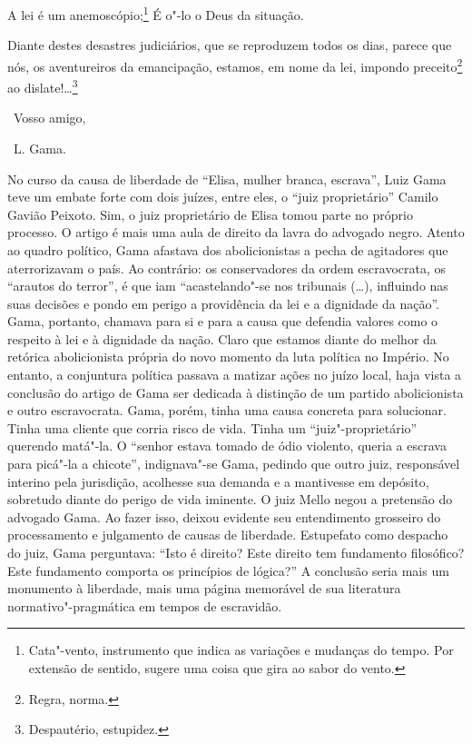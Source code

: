 A lei é um anemoscópio;\footnote{Cata"-vento, instrumento que indica as
  variações e mudanças do tempo. Por extensão de sentido, sugere uma
  coisa que gira ao sabor do vento.} É o"-lo o Deus da situação.

Diante destes desastres judiciários, que se reproduzem todos os dias,
parece que nós, os aventureiros da emancipação, estamos, em nome da lei,
impondo preceito\footnote{Regra, norma.} ao dislate!\ldots{}\footnote{
  Despautério, estupidez.}

\bigskip

\hfill\ Vosso amigo,

\hfill\ L. Gama.
\pagebreak
\mbox{}\vfill
\thispagestyle{empty}

{\small\noindent
No curso da causa de liberdade de
``Elisa, mulher branca, escrava'', Luiz Gama teve um embate forte com dois
juízes, entre eles, o ``juiz proprietário'' Camilo Gavião Peixoto. Sim, o
juiz proprietário de Elisa tomou parte no próprio processo. O artigo é
mais uma aula de direito da lavra do advogado negro. Atento ao quadro
político, Gama afastava dos abolicionistas a pecha de agitadores que
aterrorizavam o país. Ao contrário: os conservadores da ordem
escravocrata, os ``arautos do terror'', é que iam ``acastelando"-se nos
tribunais (\ldots{}), influindo nas suas decisões e pondo em perigo a
providência da lei e a dignidade da nação''. Gama, portanto, chamava para
si e para a causa que defendia valores como o respeito à lei e à
dignidade da nação. Claro que estamos diante do melhor da retórica
abolicionista própria do novo momento da luta política no Império. No
entanto, a conjuntura política passava a matizar ações no juízo local,
haja vista a conclusão do artigo de Gama ser dedicada à distinção de um
partido abolicionista e outro escravocrata. Gama, porém, tinha uma causa
concreta para solucionar. Tinha uma cliente que corria risco de vida.
Tinha um ``juiz"-proprietário'' querendo matá"-la. O ``senhor estava tomado
de ódio violento, queria a escrava para picá"-la a chicote'', indignava"-se
Gama, pedindo que outro juiz, responsável interino pela jurisdição,
acolhesse sua demanda e a mantivesse em depósito, sobretudo diante do
perigo de vida iminente. O juiz Mello negou a pretensão do advogado
Gama. Ao fazer isso, deixou evidente seu entendimento grosseiro
do processamento e julgamento de causas de liberdade. Estupefato como
despacho do juiz, Gama perguntava: ``Isto é direito? Este
direito tem fundamento filosófico? Este fundamento comporta os
princípios de lógica?'' A conclusão seria mais um monumento à liberdade,
mais uma página memorável de sua literatura normativo"-pragmática em
tempos de escravidão.}


